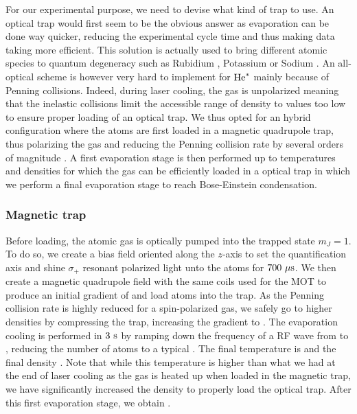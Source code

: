 For our experimental purpose, we need to devise what kind of trap to use. An optical trap would first seem to be the obvious answer as evaporation can be done way quicker, reducing the experimental cycle time and thus making data taking more efficient. This solution is actually used to bring different atomic species to quantum degeneracy such as Rubidium \cite{barrett2001all}, Potassium \cite{salomon2014all} or Sodium \cite{jacob2011production}. An all-optical scheme is however very hard to implement for $\mathrm{He}^*$ mainly because of Penning collisions. Indeed, during laser cooling, the gas is unpolarized meaning that the inelastic collisions limit the accessible range of density to values too low to ensure proper loading of an optical trap.  We thus opted for an hybrid configuration where the atoms are first loaded in a magnetic quadrupole trap, thus polarizing the gas and reducing the Penning collision rate by several orders of magnitude \cite{shlyapnikov1994decay}. A first evaporation stage is then performed up to temperatures and densities for which the gas can be efficiently loaded in a optical trap in which we perform a final evaporation stage to reach Bose-Einstein condensation.

\subsubsection{Magnetic trap}

Before loading, the atomic gas is optically pumped into the trapped state $m_J=1$. To do so, we create a bias field oriented along the $z$-axis to set the quantification axis and shine $\sigma_{+}$ resonant polarized light unto the atoms for $700 \ \mu \rm{s}$. We then create a magnetic quadrupole field with the same coils used for the MOT to produce an initial gradient of  and load  atoms into the trap. As the Penning collision rate is highly reduced for a spin-polarized gas, we safely go to higher densities by compressing the trap, increasing the gradient to . The evaporation cooling is performed in $3 \ \rm{s}$ by ramping down the frequency of a RF wave from  to , reducing the number of atoms to a typical . The final temperature is  and the final density . Note that while this temperature is higher than what we had at the end of laser cooling as the gas is heated up when loaded in the magnetic trap, we have significantly increased the density to properly load the optical trap. After this first evaporation stage, we obtain .


